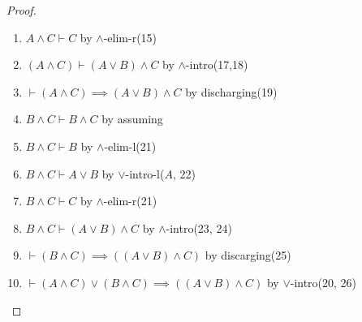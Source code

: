 \begin{proof}
\begin{enumerate}
\item $A\land C\vdash C$ by $\land$-elim-r(15)%
\item $(A\land C)\vdash(A\lor B)\land C$ by $\land$-intro(17,18)%
\item $\vdash(A\land C)\implies(A\lor B)\land C$ by discharging(19)%
\item $B\land C\vdash B\land C$ by assuming%
\item $B\land C\vdash B$ by $\land$-elim-l(21)%
\item $B\land C\vdash A\lor B$ by $\lor$-intro-l($A$, 22)%
\item $B\land C\vdash C$ by $\land$-elim-r(21)%
\item $B\land C\vdash(A\lor B)\land C$ by $\land$-intro(23, 24)%
\item $\vdash(B\land C)\implies((A\lor B)\land C)$ by discarging(25)%
\item $\vdash(A\land C)\lor(B\land C)\implies((A\lor B)\land C)$ by $\lor$-intro(20, 26)\qedhere
\end{enumerate}
\end{proof}

